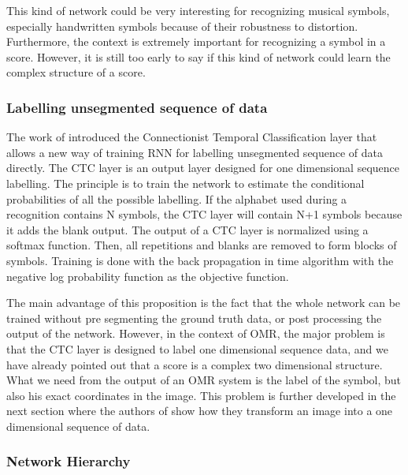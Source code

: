 \documentclass[11pt]{sdm}
\begin{document}
This kind of network could be very interesting for recognizing musical symbols, especially handwritten symbols because of their robustness to distortion.
Furthermore, the context is extremely important for recognizing a symbol in a score.
However, it is still too early to say if this kind of network could learn the complex structure of a score.

\subsubsection{Labelling unsegmented sequence of data}

The work of \cite{graves_connectionist_2006} introduced the Connectionist Temporal Classification layer that allows a new way of training RNN for labelling unsegmented sequence of data directly.
The CTC layer is an output layer designed for one dimensional sequence labelling.
The principle is to train the network to estimate the conditional probabilities of all the possible labelling.
If the alphabet used during a recognition contains N symbols, the CTC layer will contain N+1 symbols because it adds the blank output.
The output of a CTC layer is normalized using a softmax function.
Then, all repetitions and blanks are removed to form blocks of symbols.
Training is done with the back propagation in time algorithm with the negative log probability function as the objective function.

The main advantage of this proposition is the fact that the whole network can be trained without pre segmenting the ground truth data, or post processing the output of the network.
However, in the context of OMR, the major problem is that the CTC layer is designed to label one dimensional sequence data, and we have already pointed out that a score is a complex two dimensional structure.
What we need from the output of an OMR system is the label of the symbol, but also his exact coordinates in the image.
This problem is further developed in the next section where the authors of \cite{graves_offline_2009} show how they transform an image into a one dimensional sequence of data.

\subsubsection{Network Hierarchy}
\end{document}
